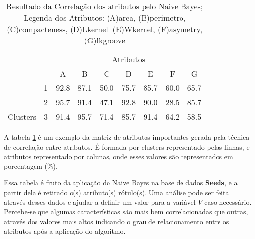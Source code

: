 \begin{table}[!h]
    
    \caption{Resultado da Correlação dos atributos pelo Naive Bayes; Legenda dos Atributos: (A)area, (B)perimetro, (C)compacteness, (D)Lkernel, (E)Wkernel, (F)asymetry, (G)lkgroove}    
    \centering
   \small\addtolength{\tabcolsep}{+2pt}
    \begin{tabular}{|cl|c|c|c|c|c|c|c|}
        \hline \hline
                                &   & \multicolumn{7}{c|}{Atributos}          \\ \cline{3-9} 
        \multicolumn{1}{|l}{}                            &   & A    & B & C & D & E & F & G \\ \hline
        \multicolumn{1}{|c|}{}                           & 1 & 92.8 & 87.1   & 50.0      & 75.7 & 85.7 & 60.0   & 65.7   \\ \cline{2-9} 
        \multicolumn{1}{|c|}{}                           & 2 & 95.7 & 91.4   & 47.1      & 92.8 & 90.0 & 28.5  & 85.7  \\ \cline{2-9} 
        \multicolumn{1}{|c|}{\multirow{-3}{*}{Clusters}} & 3 & 91.4 & 95.7   & 71.4      & 85.7 & 91.4 & 64.2  & 58.5  \\ \hline
    \end{tabular}
    \label{tab:matrelevancia:seeds:nb} 
\end{table}

A tabela \ref{tab:matrelevancia:seeds:nb} é um exemplo da matriz de atributos importantes gerada pela técnica de correlação entre atributos. É formada por clusters representado pelas linhas, e atributos representado por colunas, onde esses valores são representados em porcentagem (\%). 

Essa tabela é fruto da aplicação do Naive Bayes na base de dados \textbf{Seeds}, e a partir dela é retirado o(s) atributo(s) rótulo(s). Uma análise pode ser feita através desses dados e ajudar a definir um valor para a variável ${V}$ caso necessário. Percebe-se que algumas características são mais bem correlacionadas que  outras, através dos valores mais altos indicando o grau de relacionamento entre os atributos após a aplicação do algoritmo. 


